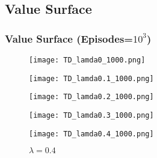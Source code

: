 \documentclass{beamer}
\begin{document}
\subsection{Value Surface}
\begin{frame}
    \frametitle{Value Surface (Episodes=$10^3$)}
    \begin{figure}[ht]
        
        \begin{minipage}[b]{0.15\linewidth}
        \centering
        \texttt{[image: TD\_lamda0\_1000.png]}
        {\caption*{$\lambda = 0.0$}}
        \end{minipage}
        \hspace{0.02 \linewidth}
        \begin{minipage}[b]{0.15\linewidth}
        \centering
        \texttt{[image: TD\_lamda0.1\_1000.png]}
        {\caption*{$\lambda = 0.1$}}
        \end{minipage}
        \hspace{0.02 \linewidth}
        \begin{minipage}[b]{0.15\linewidth}
        \centering
        \texttt{[image: TD\_lamda0.2\_1000.png]}
        {\caption*{$\lambda = 0.2$}}
        \end{minipage}
        \hspace{0.02 \linewidth}
        \begin{minipage}[b]{0.15\linewidth}
        \centering
        \texttt{[image: TD\_lamda0.3\_1000.png]}
        {\caption*{$\lambda = 0.3$}}
        \end{minipage}
        \hspace{0.02 \linewidth}
        \hspace{0.02 \linewidth}
        \begin{minipage}[b]{0.15\linewidth}
        \centering
        \texttt{[image: TD\_lamda0.4\_1000.png]}
        {\caption*{$\lambda = 0.4$}}
        \end{minipage}
        \hspace{0.02 \linewidth}
        

\end{figure}
\end{frame}
\end{document}
